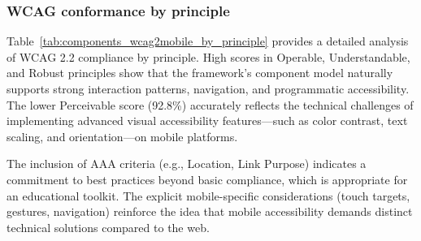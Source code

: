 \subsubsection{WCAG conformance by principle}

Table~\ref{tab:components_wcag2mobile_by_principle} provides a detailed analysis of WCAG 2.2 compliance by principle. High scores in Operable, Understandable, and Robust principles show that the framework’s component model naturally supports strong interaction patterns, navigation, and programmatic accessibility. The lower Perceivable score (92.8\%) accurately reflects the technical challenges of implementing advanced visual accessibility features—such as color contrast, text scaling, and orientation—on mobile platforms.

The inclusion of AAA criteria (e.g., Location, Link Purpose) indicates a commitment to best practices beyond basic compliance, which is appropriate for an educational toolkit. The explicit mobile-specific considerations (touch targets, gestures, navigation) reinforce the idea that mobile accessibility demands distinct technical solutions compared to the web.

